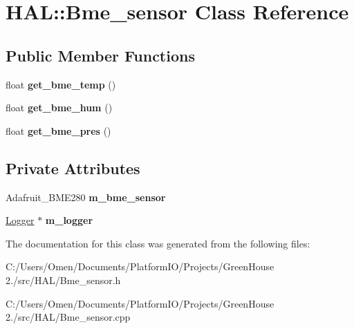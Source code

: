 \hypertarget{class_h_a_l_1_1_bme__sensor}{}\section{H\+AL\+:\+:Bme\+\_\+sensor Class Reference}
\label{class_h_a_l_1_1_bme__sensor}
\subsection*{Public Member Functions}
\begin{DoxyCompactItemize}
\item 
\mbox{\label{class_h_a_l_1_1_bme__sensor_a9257ed19ecfa030c8b639335e71def99}} 
float {\bfseries get\+\_\+bme\+\_\+temp} ()
\item 
\mbox{\label{class_h_a_l_1_1_bme__sensor_afabb5c562834bb4c8225436aa7d9a142}} 
float {\bfseries get\+\_\+bme\+\_\+hum} ()
\item 
\mbox{\label{class_h_a_l_1_1_bme__sensor_a1fb94c705cc628719170a4aeef6265fb}} 
float {\bfseries get\+\_\+bme\+\_\+pres} ()
\end{DoxyCompactItemize}
\subsection*{Private Attributes}
\begin{DoxyCompactItemize}
\item 
\mbox{\label{class_h_a_l_1_1_bme__sensor_ac3a3375e6b54d16c11a96cc33273acca}} 
Adafruit\+\_\+\+B\+M\+E280 {\bfseries m\+\_\+bme\+\_\+sensor}
\item 
\mbox{\label{class_h_a_l_1_1_bme__sensor_a1516094dfbf7459c116fa793131f411c}} 
\hyperlink{class_logger}{Logger} $\ast$ {\bfseries m\+\_\+logger}
\end{DoxyCompactItemize}


The documentation for this class was generated from the following files\+:\begin{DoxyCompactItemize}
\item 
C\+:/\+Users/\+Omen/\+Documents/\+Platform\+I\+O/\+Projects/\+Green\+House 2./src/\+H\+A\+L/Bme\+\_\+sensor.\+h\item 
C\+:/\+Users/\+Omen/\+Documents/\+Platform\+I\+O/\+Projects/\+Green\+House 2./src/\+H\+A\+L/Bme\+\_\+sensor.\+cpp\end{DoxyCompactItemize}
